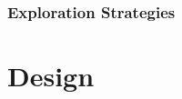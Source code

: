 \documentclass[11pt,twoside]{report}
\begin{document}
\subsubsection{Exploration Strategies}

\section{Design}

\end{document}
